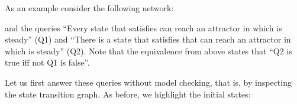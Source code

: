 \documentclass[letterpaper,10pt,english]{sphinxmanual}
\begin{document}
As an example consider the following network:

\begin{sphinxVerbatim}[commandchars=\\\{\}]
  \PYG{p}{[}
        
        \PYG{p}{]}
  
  
\end{sphinxVerbatim}

and the queries “Every state that satisfies  can reach an attractor in which  is steady” (Q1)
and “There is a state that satisfies  that can reach an attractor in which  is steady” (Q2).
Note that the equivalence from above states that “Q2 is true iff not Q1 is false”.

Let us first answer these queries without model checking, that is, by inspecting the state transition graph.
As before, we highlight the initial states:
\end{document}
